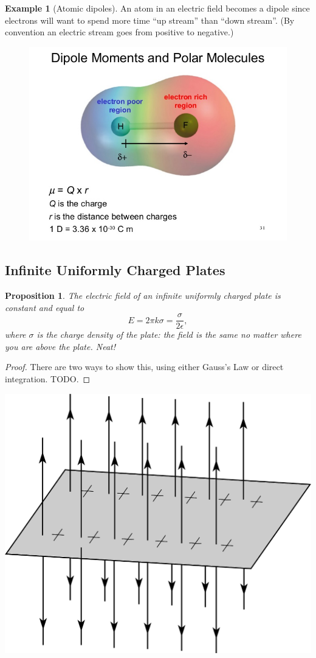 \documentclass[12pt]{article}
\theoremstyle{plain}
\newtheorem{proposition}[theorem]{Proposition}
\theoremstyle{definition}
\newtheorem{example}[theorem]{Example}
\theoremstyle{remark}
\begin{document}
\begin{example}[Atomic dipoles]
An atom in an electric field becomes a dipole since electrons will want to spend more time ``up stream'' than ``down stream''. (By convention an electric stream goes from positive to negative.)
\end{example}

\begin{figure}[H]
\centering
\includegraphics[width=.7\textwidth]{chapter-10-chemical-bonding-ii-molecular-geometry-and-hybridization-of-atomic-orbitals-31-638}
\end{figure}

\subsection{Infinite Uniformly Charged Plates}

\begin{proposition}
The electric field of an infinite uniformly charged plate is constant and equal to $$E = 2 \pi k \sigma = \frac{\sigma}{2 \epsilon},$$ where $\sigma$ is the charge density of the plate: the field is the same no matter where you are above the plate. Neat!
\end{proposition}

\begin{proof}
There are two ways to show this, using either Gauss's Law or direct integration. TODO.
\end{proof}

\centerline{\includegraphics[width=.7\textwidth]{infiniteplate}}
\end{document}
